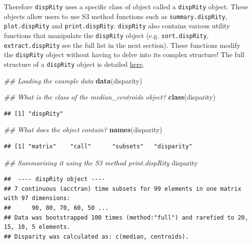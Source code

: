 \documentclass[]{book}
\newenvironment{Shaded}{\begin{snugshade}}{\end{snugshade}}
\newcommand{\CommentTok}[1]{\textcolor[rgb]{0.56,0.35,0.01}{\textit{#1}}}
\newcommand{\KeywordTok}[1]{\textcolor[rgb]{0.13,0.29,0.53}{\textbf{#1}}}
\newcommand{\NormalTok}[1]{#1}
\begin{document}
Therefore \texttt{dispRity} uses a specific class of object called a \texttt{dispRity} object.
These objects allow users to use S3 method functions such as \texttt{summary.dispRity}, \texttt{plot.dispRity} and \texttt{print.dispRity}.
\texttt{dispRity} also contains various utility functions that manipulate the \texttt{dispRity} object (e.g. \texttt{sort.dispRity}, \texttt{extract.dispRity} see the full list in the next section).
These functions modify the \texttt{dispRity} object without having to delve into its complex structure!
The full structure of a \texttt{dispRity} object is detailed \href{https://github.com/TGuillerme/dispRity/blob/master/disparity_object.md}{here}.

\begin{Shaded}
\begin{Highlighting}[]
\CommentTok{## Loading the example data}
\KeywordTok{data}\NormalTok{(disparity)}

\CommentTok{## What is the class of the median_centroids object?}
\KeywordTok{class}\NormalTok{(disparity)}
\end{Highlighting}
\end{Shaded}

\begin{verbatim}
## [1] "dispRity"
\end{verbatim}

\begin{Shaded}
\begin{Highlighting}[]
\CommentTok{## What does the object contain?}
\KeywordTok{names}\NormalTok{(disparity)}
\end{Highlighting}
\end{Shaded}

\begin{verbatim}
## [1] "matrix"    "call"      "subsets"   "disparity"
\end{verbatim}

\begin{Shaded}
\begin{Highlighting}[]
\CommentTok{## Summarising it using the S3 method print.dispRity}
\NormalTok{disparity}
\end{Highlighting}
\end{Shaded}

\begin{verbatim}
##  ---- dispRity object ---- 
## 7 continuous (acctran) time subsets for 99 elements in one matrix with 97 dimensions:
##      90, 80, 70, 60, 50 ...
## Data was bootstrapped 100 times (method:"full") and rarefied to 20, 15, 10, 5 elements.
## Disparity was calculated as: c(median, centroids).
\end{verbatim}
\end{document}
